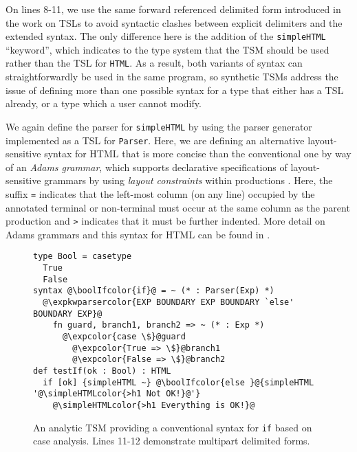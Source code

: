 \documentclass{sig-alternate}[10pt]
\newcommand{\expkwparsercolor}[1]{\textcolor[HTML]{336699}{#1}}
\newcommand{\expcolor}[1]{\textcolor[HTML]{FF0033}{#1}}
\newcommand{\simpleHTMLcolor}[1]{\textcolor[HTML]{7D5100}{#1}}
\newcommand{\boolIfcolor}[1]{\textcolor[HTML]{5E0C0C}{#1}}
\newcommand{\mycaption}[1]{\vspace{-4px}\caption{#1}\vspace{-2px}}
\begin{document}
 On lines 8-11, we use the same forward referenced delimited form introduced in the work on TSLs to avoid syntactic clashes between explicit delimiters and the extended syntax. The only difference here is the addition of the \verb|simpleHTML| ``keyword'', which indicates to the type system that the TSM should be used rather than the TSL for \verb|HTML|. As a result, both variants of syntax can straightforwardly be used in the same program, so synthetic TSMs address the issue of defining more than one possible syntax for a type that either has a TSL  already, or a type which a user cannot modify.

We again define the parser for \verb|simpleHTML| by using the parser generator implemented as a TSL for \verb|Parser|. Here, we are defining an alternative layout-sensitive syntax for HTML that is more concise than the conventional one by way of an \emph{Adams grammar}, which supports declarative specifications of layout-sensitive grammars by using \emph{layout constraints} within productions \cite{Adams:2013:PPI:2429069.2429129}. Here, the suffix \verb|=| indicates that the left-most column (on any line) occupied by the annotated terminal or non-terminal must occur at the same column as the parent production and \verb|>| indicates that it must be further indented. More detail on Adams grammars and this syntax for HTML can be found in \cite{TSLs}. 




\begin{figure}[t]
\begin{lstlisting}[style=wyvern]
type Bool = casetype 
  True
  False
syntax @\boolIfcolor{if}@ = ~ (* : Parser(Exp) *)
  @\expkwparsercolor{EXP BOUNDARY EXP BOUNDARY `else' BOUNDARY EXP}@
    fn guard, branch1, branch2 => ~ (* : Exp *)
      @\expcolor{case \$}@guard
        @\expcolor{True => \$}@branch1
        @\expcolor{False => \$}@branch2
def testIf(ok : Bool) : HTML
  if [ok] {simpleHTML ~} @\boolIfcolor{else }@{simpleHTML '@\simpleHTMLcolor{>h1 Not OK!}@'}
    @\simpleHTMLcolor{>h1 Everything is OK!}@
\end{lstlisting}
\mycaption{An analytic TSM providing a conventional syntax for \texttt{if} based on case analysis. Lines 11-12 demonstrate multipart delimited forms.}
\label{if-example}
\end{figure}
\end{document}
